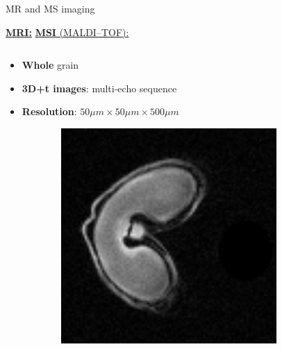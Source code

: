 \documentclass[10pt]{beamer}
\begin{document}
\begin{frame}{MR and MS imaging}

  \underline{\textbf{MRI:}} \hspace{0.5\textwidth} \underline{\textbf{MSI} (MALDI--TOF):}

  \begin{columns}
    \begin{column}[t]{.5\textwidth}
      \begin{itemize}
      \item \textbf{Whole} grain
      \item \textbf{3D+t images}:  \alert{multi-echo} sequence
      \item \textbf{Resolution}: $50 \mu m \times 50 \mu m \times 500 \mu m$
      \end{itemize}
      \vspace{1cm}
      \begin{figure}[ht]
        \centering
        \begin{subfigure}[t]{0.33\textwidth}
          \centering \includegraphics[width=0.9\textwidth]{fig/echo2_1}
        \end{subfigure}%
        \begin{subfigure}[t]{0.33\textwidth}

\end{subfigure}
\end{figure}
\end{column}
\end{columns}
\end{frame}
\end{document}
